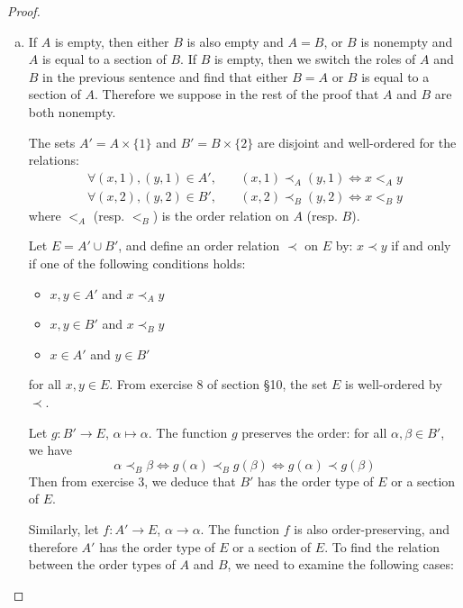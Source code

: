 \documentclass[11pt,a4paper,twoside]{article}
\theoremstyle{definition}
\begin{document}
\begin{proof}\hfill

  \begin{enumerate}[(a)]

    \item\label{point:a}
      If $A$ is empty, then either $B$ is also empty and $A = B$, or $B$ is nonempty and $A$ is equal to a section of $B$.
      If $B$ is empty, then we switch the roles of $A$ and $B$ in the previous sentence and find that either $B = A$ or
      $B$ is equal to a section of $A$. Therefore we suppose in the rest of the proof that $A$ and $B$ are both nonempty.
  
      The sets $A' = A \times \{ 1 \}$ and $B' = B \times \{ 2 \}$ are disjoint and well-ordered for the relations:
      \begin{align*}
        \forall ( x, 1 ), ( y, 1 ) \in A', &\quad ( x, 1 ) \prec_A ( y, 1 ) \iff x <_A y \\
        \forall ( x, 2 ), ( y, 2 ) \in B', &\quad ( x, 2 ) \prec_B ( y, 2 ) \iff x <_B y
      \end{align*}
      where $<_A$ (resp. $<_B$) is the order relation on $A$ (resp. $B$).

      Let $E = A' \cup B'$, and define an order relation $\prec$ on $E$ by: $x \prec y$ if and only if one of the following
      conditions holds:
      \begin{itemize}
        \item $x, y \in A'$ and $x \prec_A y$
        \item $x, y \in B'$ and $x \prec_B y$
        \item $x \in A'$ and $y \in B'$
      \end{itemize}
      for all $x, y \in E$.
      From exercise 8 of section \S 10, the set $E$ is well-ordered by $\prec$.

      Let $g : B' \to E$, $\alpha \mapsto \alpha$. The function $g$ preserves the order: for all $\alpha, \beta \in B'$,
      we have
      \begin{equation*}
        \alpha \prec_B \beta \iff
        g ( \alpha ) \prec_B g ( \beta ) \iff
        g ( \alpha ) \prec g ( \beta )
      \end{equation*}
      Then from exercise 3, we deduce that $B'$ has the order type of $E$ or a section of $E$.

      Similarly, let $f : A' \to E$, $\alpha \to \alpha$. The function $f$ is also order-preserving, and therefore
      $A'$ has the order type of $E$ or a section of $E$. To find the relation between the order types of $A$ and $B$,
      we need to examine the following cases:
      \begin{itemize}


\end{itemize}
\end{enumerate}
\end{proof}
\end{document}
